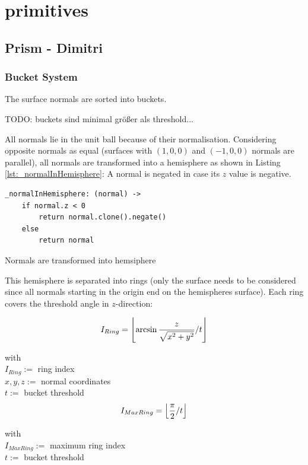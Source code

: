 \documentclass[../ClassicThesis.tex]{subfiles}
\begin{document}
\section{primitives}
\subsection{Prism - Dimitri}

\subsubsection{Bucket System}

The surface normals are sorted into buckets.

TODO: buckets sind minimal größer als threshold...


All normals lie in the unit ball  because of their normalisation. Considering opposite normals as equal (surfaces with $(1,0,0)$ and $(-1,0,0)$ normals are parallel), all normals are transformed into a hemisphere as shown in Listing \ref{lst:_normalInHemisphere}: A normal is negated in case its $z$ value is negative. 


\begin{listing}[!h]
\centering
\begin{verbatim}
_normalInHemisphere: (normal) ->
    if normal.z < 0
        return normal.clone().negate()
    else
        return normal
\end{verbatim}
\caption{Normals are transformed into hemsiphere}
\label{lst:_normalInHemisphere}
\end{listing}


This hemisphere is separated into rings (only the surface needs to be considered since all normals starting in the origin end on the hemispheres surface). Each ring covers the threshold angle in $z$-direction:

\begin{equation*}
    I_{Ring} = \floor*{ 
                    \arcsin{ 
                        \frac{z}{ \sqrt{ x^{2} + y^{2} } } 
                    } 
                    / t 
                }
\end{equation*}

with \\
$I_{Ring} := $ ring index \\
$ x, y, z := $ normal coordinates \\
$ t := $ bucket threshold \\


\begin{equation*}
    I_{MaxRing} = \floor*{
                    \frac{\pi}{2}
                    / t
                  }
\end{equation*}

with \\
$I_{MaxRing} := $ maximum ring index \\
$ t := $ bucket threshold \\


\end{document}
